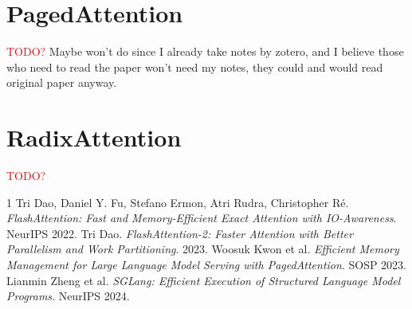 \documentclass{article}
\begin{document}
\section{PagedAttention}
\textcolor{red}{TODO?} Maybe won't do since I already take notes by zotero, and I believe those who need to read the paper won't need my notes, they could and would read original paper anyway.

\section{RadixAttention}
\textcolor{red}{TODO?}

\begin{thebibliography}{1}
 Tri Dao, Daniel Y. Fu, Stefano Ermon, Atri Rudra, Christopher Ré. \emph{FlashAttention: Fast and Memory-Efficient Exact Attention with IO-Awareness}. NeurIPS 2022.
 Tri Dao. \emph{FlashAttention-2: Faster Attention with Better Parallelism and Work Partitioning}. 2023.
 Woosuk Kwon et al. \emph{Efficient Memory Management for Large Language Model Serving with PagedAttention}. SOSP 2023.
 Lianmin Zheng et al. \emph{SGLang: Efficient Execution of Structured Language Model Programs}. NeurIPS 2024.
\end{thebibliography}
\end{document}
